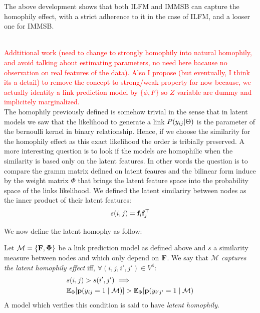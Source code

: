 The above development shows that both ILFM and IMMSB can capture the homophily effect, with a strict adherence to it in the case of ILFM, and a looser one for IMMSB.


~\\
\textcolor{red}{Addtitional work (need to change to strongly homophily into natural homophily, and avoid talking about estimating parameters, no need here bacause no observation on real features of the data). Also I propose (but eventually, I think its a detail) to remove the concept to strong/weak property for now because, we actually identity a link prediction model by $\{\phi, F\}$ so $Z$ variable are dummy and implicitely marginalized.}
~\\


The homophily previously defined is somehow trivial in the sense that in latent models we saw that the likelihood to generate a link $P(y_{ij} |\Theta)$ is the parameter of the bernoulli kernel in binary relationship. Hence, if we choose the similarity for the homophily effect as this exact likelihood the order is tribially preserved. A more interesting question is to look if the models are homophilic when the similarity is based only on the latent features. In other words the question is to compare the gramm matrix defined on latent feaures and the bilinear form induce by the weight matrix $\Phi$ that brings the latent feature space into the probability space of the links likelihood. We defined the latent similariry between nodes as the inner product of their latent features:
\begin{equation}
s(i,j) = \mat{f}_{i} \mat{f}_j^\top
\label{eq:latent-sim}
\end{equation}

We now define the latent homophy as follow:

\begin{definition}
	Let $\mathcal{M}=\{\mathbf{F},\mathbf{\Phi}\}$ be a link prediction model as defined above and $s$ a similarity  measure between nodes and which only depend on $\mathbf{F}$. We say that \emph{$\mathcal{M}$ captures the latent homophily effect} iff, $\forall (i,j,i',j') \in V^4$:
%
\begin{align}
&s(i,j) > s(i',j')  \implies \nonumber\\
&\mathbb{E}_\Phi[\mathbf{p}(y_{ij}=1 \mid \mathcal{M})] > \mathbb{E}_\Phi[\mathbf{p}(y_{i'j'}=1 \mid \mathcal{M}) \nonumber
\end{align}
%
A model which verifies this condition is said to have \emph{latent homophily}.
\end{definition}
%

